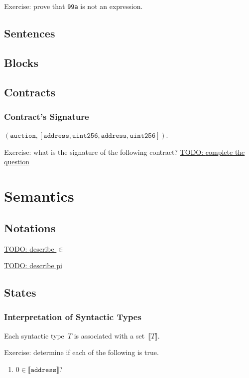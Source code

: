 \documentclass{book}
\newcommand{\todo}[1]{\underline{TODO: {#1}}}
\newcommand{\sem}[1]{\llbracket{#1}\rrbracket}
\begin{document}
Exercise: prove that \texttt{99a} is not an expression.

\section{Sentences}

\section{Blocks}

\section{Contracts}

\subsection{Contract's Signature}

$(\mathtt{auction}, [\mathtt{address}, \mathtt{uint256}, \mathtt{address}, \mathtt{uint256}])$.

Exercise: what is the signature of the following contract?
\todo{complete the question}

\chapter{Semantics}

\section{Notations}

\todo{describe $\in$}

\todo{describe pi}

\section{States}

\subsection{Interpretation of Syntactic Types}
Each syntactic type~$T$ is associated with a set~$\sem{T}$.

Exercise: determine if each of the following is true.
\begin{enumerate}
  \item $0 \in\sem{\mathtt{address}}$?
\end{enumerate}
\end{document}

